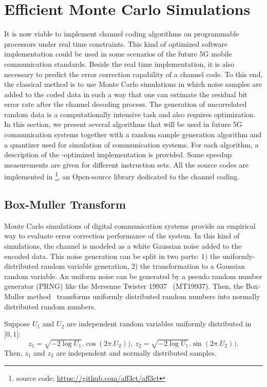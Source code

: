 \section{Efficient Monte Carlo Simulations}

It is now viable to implement channel coding algorithms on programmable
processors under real time constraints. This kind of optimized software
implementation could be used in some scenarios of the future 5G mobile
communication standards. Beside the real time implementation, it is also
necessary to predict the error correction capability of a channel code. To this
end, the classical method is to use Monte Carlo simulations in which noise
samples are added to the coded data in such a way that one can estimate the
residual bit error rate after the channel decoding process. The generation of
uncorrelated random data is a computationally intensive task and also requires
optimization. In this section, we present several algorithms that will be used
in future 5G communication systems together with a random sample generation
algorithm and a quantizer used for simulation of communication systems. For each
algorithm, a description of the \MIPP-optimized implementation is provided. Some
speedup measurements are given for different instruction sets. All the source
codes are implemented in \AFFECT\footnote{\AFFECT source code:
\url{https://github.com/aff3ct/aff3ct}}, an Open-source library dedicated to the
channel coding.

\subsection{Box-Muller Transform}
\label{sec:vec_awgn}

Monte Carlo simulations of digital communication systems provide an empirical
way to evaluate error correction performance of the system. In this kind of
simulations, the channel is modeled as a white Gaussian noise added to the
encoded data. This noise generation can be split in two parts: 1) the
uniformly-distributed random variable generation, 2) the transformation to a
Gaussian random variable. An uniform noise can be generated by a pseudo random
number generator (PRNG) like the Mersenne Twister 19937~\cite{Matsumoto1998}
(MT19937). Then, the Box-Muller method~\cite{Box1958} transforms uniformly
distributed random numbers into normally distributed random numbers.

Suppose $U_1$ and $U_2$ are independent random variables uniformly distributed
in $]0, 1]$:
\begin{equation*}
  z_1 = \sqrt{-2 \log{U_1}}.\cos(2\pi.U_2)),~z_2 = \sqrt{-2 \log{U_1}}.\sin(2\pi.U_2)).
\end{equation*}
Then, $z_1$ and $z_2$ are independent and normally distributed samples.

